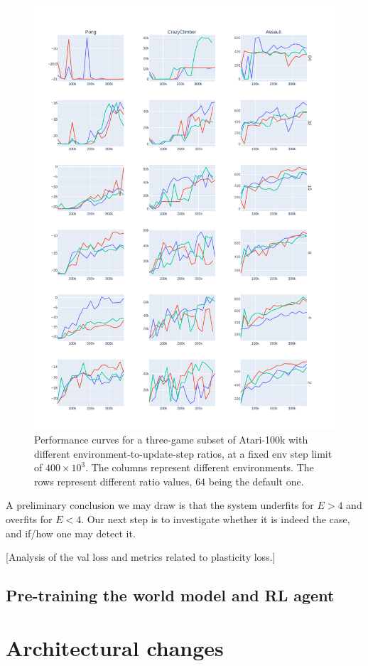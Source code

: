 \documentclass[twoside,11pt]{article}
\begin{document}
\begin{figure}
  \centering
  \includegraphics[width=0.8\linewidth,height=0.8\paperheight,keepaspectratio]{assets/naive_at_400k.pdf}
  \caption{Performance curves for a three-game subset of Atari-100k with different environment-to-update-step ratios, at a fixed env step limit of $400 \times 10^3$. The columns represent different environments. The rows represent different ratio values, $64$ being the default one.}
  \label{fig:naive_lim}
\end{figure}

A preliminary conclusion we may draw is that the system underfits for $E > 4$ and overfits for $E < 4$. Our next step is to investigate whether it is indeed the case, and if/how one may detect it.

  [Analysis of the val loss and metrics related to plasticity loss.]

\subsection{Pre-training the world model and RL agent}

\section{Architectural changes}
\end{document}
